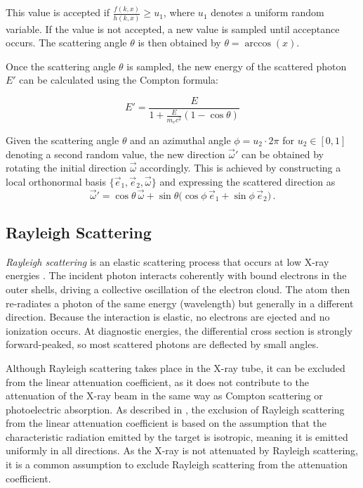 This value is accepted if $\frac{f(k,x)}{h(k,x)} \geq u_1$, where $u_1$ denotes a uniform random variable. If the value is not accepted, a new value is sampled until acceptance occurs. The scattering angle $\theta$ is then obtained by $\theta = \arccos(x)$.

Once the scattering angle $\theta$ is sampled, the new energy of the scattered
photon $E'$ can be calculated using the Compton formula:

\begin{equation}
    \label{eq:compton_energy}
    E' = \frac{E}{1 + \frac{E}{m_e c^2} (1 - \cos \theta)}
\end{equation}

Given the scattering angle $\theta$ and an azimuthal angle $\phi=u_2 \cdot 2\pi$
for $u_2\in[0,1]$ denoting a second random value, the new direction
$\vec{\omega}'$ can be obtained by rotating the initial direction $\vec{\omega}$
accordingly. This is achieved by constructing a local orthonormal basis
$\{\vec{e}_1,\vec{e}_2,\vec{\omega}\}$ and expressing the scattered direction as  
\[
    \vec{\omega}' = \cos\theta \, \vec{\omega}
    + \sin\theta \bigl(\cos\phi \, \vec{e}_1 + \sin\phi \, \vec{e}_2\bigr)\,.
\]


\subsection{Rayleigh Scattering}
\emph{Rayleigh scattering} is an elastic scattering process that occurs at low
X-ray energies \cite[Chapter 7]{medicalImagingSystemsIntro2019:}. The incident
photon interacts coherently with bound electrons in the outer shells, driving a
collective oscillation of the electron cloud. The atom then re-radiates a photon
of the same energy (wavelength) but generally in a different direction. Because
the interaction is elastic, no electrons are ejected and no ionization occurs.
At diagnostic energies, the differential cross section is strongly
forward-peaked, so most scattered photons are deflected by small angles.

Although Rayleigh scattering takes place in the X-ray tube, it can be excluded
from the linear attenuation coefficient, as it does not contribute to the
attenuation of the X-ray beam in the same way as Compton scattering or
photoelectric absorption. As described in \cite{poludniowski2022calculating},
the exclusion of Rayleigh scattering from the linear attenuation coefficient is
based on the assumption that the characteristic radiation emitted by the target
is isotropic, meaning it is emitted uniformly in all directions. As the X-ray is
not attenuated by Rayleigh scattering, it is a common assumption to exclude
Rayleigh scattering from the attenuation coefficient.


